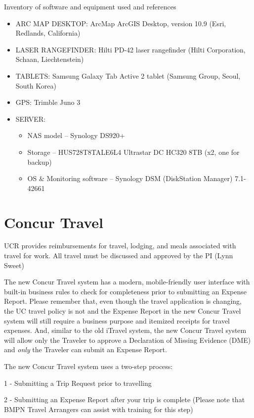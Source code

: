 \documentclass[
]{book}
\providecommand{\tightlist}{%
  \setlength{\itemsep}{0pt}\setlength{\parskip}{0pt}}
\begin{document}
Inventory of software and equipment used and references

\begin{itemize}
\item
  ARC MAP DESKTOP: ArcMap ArcGIS Desktop, version 10.9 (Esri, Redlands, California)
\item
  LASER RANGEFINDER: Hilti PD-42 laser rangefinder (Hilti Corporation, Schaan, Liechtenstein)
\item
  TABLETS: Samsung Galaxy Tab Active 2 tablet (Samsung Group, Seoul, South Korea)
\item
  GPS: Trimble Juno 3
\item
  SERVER:

  \begin{itemize}
  \tightlist
  \item
    NAS model -- Synology DS920+
  \item
    Storage -- HUS728T8TALE6L4 Ultrastar DC HC320 8TB (x2, one for backup)
  \item
    OS \& Monitoring software -- Synology DSM (DiskStation Manager) 7.1-42661
  \end{itemize}
\end{itemize}

\hypertarget{concur}{%
\chapter{Concur Travel}\label{concur}}

UCR provides reimbursements for travel, lodging, and meals associated with travel for work. All travel must be discussed and approved by the PI (Lynn Sweet)

The new Concur Travel system has a modern, mobile-friendly user interface with built-in business rules to check for completeness prior to submitting an Expense Report. Please remember that, even though the travel application is changing, the UC travel policy is not and the Expense Report in the new Concur Travel system will still require a business purpose and itemized receipts for travel expenses. And, similar to the old iTravel system, the new Concur Travel system will allow only the Traveler to approve a Declaration of Missing Evidence (DME) and \emph{only} the Traveler can submit an Expense Report.

The new Concur Travel system uses a two-step process:

1 - Submitting a Trip Request prior to travelling

2 - Submitting an Expense Report after your trip is complete (Please note that BMPN Travel Arrangers can assist with training for this step)
\end{document}

